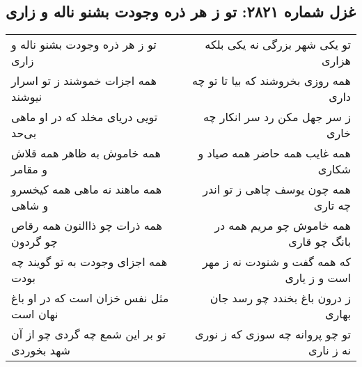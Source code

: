 \begin{center}
\section*{غزل شماره ۲۸۲۱: تو ز هر ذره وجودت بشنو ناله و زاری}
\label{sec:2821}
\begin{longtable}{l p{0.5cm} r}
تو ز هر ذره وجودت بشنو ناله و زاری
&&
تو یکی شهر بزرگی نه یکی بلکه هزاری
\\
همه اجزات خموشند ز تو اسرار نیوشند
&&
همه روزی بخروشند که بیا تا تو چه داری
\\
تویی دریای مخلد که در او ماهی بی‌حد
&&
ز سر جهل مکن رد سر انکار چه خاری
\\
همه خاموش به ظاهر همه قلاش و مقامر
&&
همه غایب همه حاضر همه صیاد و شکاری
\\
همه ماهند نه ماهی همه کیخسرو و شاهی
&&
همه چون یوسف چاهی ز تو اندر چه تاری
\\
همه ذرات چو ذاالنون همه رقاص چو گردون
&&
همه خاموش چو مریم همه در بانگ چو قاری
\\
همه اجزای وجودت به تو گویند چه بودت
&&
که همه گفت و شنودت نه ز مهر است و ز یاری
\\
مثل نفس خزان است که در او باغ نهان است
&&
ز درون باغ بخندد چو رسد جان بهاری
\\
تو بر این شمع چه گردی چو از آن شهد بخوردی
&&
تو چو پروانه چه سوزی که ز نوری نه ز ناری
\\
\end{longtable}
\end{center}
